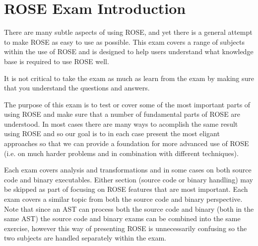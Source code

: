 \chapter{ROSE Exam Introduction}
\label{rose_exam_introduction}

   There are many subtle aspects of using ROSE, and yet there is a general
attempt to make ROSE as easy to use as possible.  This exam covers
a range of subjects within the use of ROSE and is designed to help
users understand what knowledge base is required to use ROSE well.

It is not critical to take the exam as much as learn from the exam 
by making sure that you understand the questions and answers.

The purpose of this exam is to test or cover some of the most important parts
of using ROSE and make sure that a number of fundamental parts of ROSE are
understood.  In most cases there are many ways to acomplish the same
result using ROSE and so our goal is to in each case present the most
eligant approaches so that we can provide a foundation for more advanced
use of ROSE (i.e. on much harder problems and in combination with different 
techniques).

Each exam covers analysis and transformations and in some cases on
both source code and binary executables.  Either section (source
code or binary handling) may be skipped as part of focusing on 
ROSE features that are most important.  Each exam covers
a similar topic from both the source code and binary perspective.
Note that since an AST can process both the source code and binary
(both in the same AST) the source code and binary exams can be combined 
into the same exercise, however this way of presenting ROSE is unnecessarily
confusing so the two subjects are handled separately within the exam.

